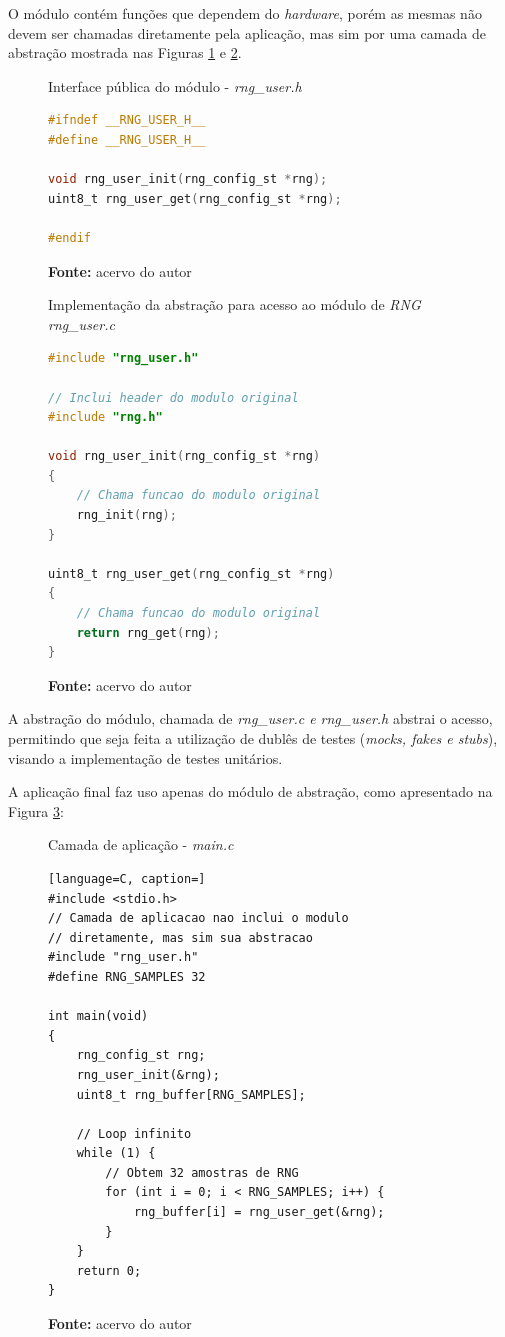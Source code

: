 \documentclass[times, twoside, watermark]{artigo}
\begin{document}
O módulo contém funções que dependem do \textit{hardware}, porém as mesmas não
devem ser chamadas diretamente pela aplicação, mas sim por uma camada de abstração
mostrada nas Figuras \ref{fig:rng_user.h} e \ref{fig:rng_user.c}.\hfill\\

\begin{figure}[H]
  \centering
  \caption{Interface pública do módulo - \textit{rng\_user.h}}
\begin{lstlisting}[language=C]
#ifndef __RNG_USER_H__
#define __RNG_USER_H__

void rng_user_init(rng_config_st *rng);
uint8_t rng_user_get(rng_config_st *rng);

#endif
\end{lstlisting}
  \label{fig:rng_user.h}
  \caption*{\newline\textbf{Fonte:} acervo do autor}
\end{figure}

\begin{figure}[H]
  \centering
  \caption{Implementação da abstração para acesso ao módulo de \textit{RNG}
\textit{rng\_user.c}}
\begin{lstlisting}[language=C]
#include "rng_user.h"

// Inclui header do modulo original
#include "rng.h"

void rng_user_init(rng_config_st *rng)
{
    // Chama funcao do modulo original
    rng_init(rng);
}

uint8_t rng_user_get(rng_config_st *rng)
{
    // Chama funcao do modulo original
    return rng_get(rng);
}

\end{lstlisting}
  \label{fig:rng_user.c}
  \caption*{\newline\textbf{Fonte:} acervo do autor}
\end{figure}

A abstração do módulo, chamada de \textit{rng\_user.c e rng\_user.h} abstrai o
acesso, permitindo que seja feita a utilização de dublês de testes (\textit{mocks,
fakes e stubs}), visando a implementação de testes unitários.

A aplicação final faz uso apenas do módulo de abstração, como apresentado na Figura 
\ref{fig:main.c}:\hfill\\

\begin{figure}[H]
  \centering
  \caption{Camada de aplicação - \textit{main.c}}
\begin{lstlisting}[language=C, caption=]
#include <stdio.h>
// Camada de aplicacao nao inclui o modulo
// diretamente, mas sim sua abstracao
#include "rng_user.h"
#define RNG_SAMPLES 32

int main(void)
{	
	rng_config_st rng;
	rng_user_init(&rng);
	uint8_t rng_buffer[RNG_SAMPLES];
    
	// Loop infinito
	while (1) {
		// Obtem 32 amostras de RNG
		for (int i = 0; i < RNG_SAMPLES; i++) {
			rng_buffer[i] = rng_user_get(&rng);
		}
	}
    return 0;
}
\end{lstlisting}
  \label{fig:main.c}
  \caption*{\newline\textbf{Fonte:} acervo do autor}
\end{figure}
\end{document}
